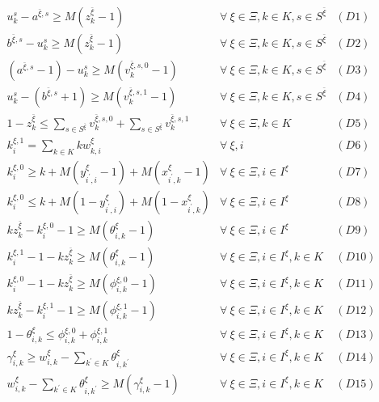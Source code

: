\documentclass[]{interact}
\theoremstyle{plain}%
\theoremstyle{definition}
\theoremstyle{remark}
\begin{document}
\begin{eqnarray}
u^s_k - a^{\bar{\xi},s} \ge M(z^{\bar{\xi}}_{k}-1)&\forall\ \xi\in \Xi,k\in K,s\in S^{\bar{\xi}}&(D1)\nonumber\\
b^{\bar{\xi},s} - u^s_k \ge M(z^{\bar{\xi}}_{k}-1)&\forall\ \xi\in \Xi,k\in K,s\in S^{\bar{\xi}}&(D2)\nonumber\\
( a^{\bar{\xi},s}-1) - u^s_k \ge M(v^{\bar{\xi},s,0}_k-1) & \forall\ \xi\in \Xi,k\in K,s\in S^{\bar{\xi}} &(D3)\nonumber\\
u^s_k -  (b^{\bar{\xi},s}+1) \ge M(v^{\bar{\xi},s,1}_k-1) & \forall\ \xi\in \Xi,k\in K,s\in S^{\bar{\xi}} &(D4)\nonumber\\
1 - z^{\bar{\xi}}_{k} \le \sum_{s\in S^{\bar{\xi}}} v^{\bar{\xi},s,0}_k + \sum_{s\in S^{\bar{\xi}}} v^{\bar{\xi},s,1}_k&\forall\ \xi\in \Xi,k\in K&(D5)\nonumber\\
k^{\xi,1}_i = \sum_{k\in K}kw^{\xi}_{k,i}&\forall\ \xi,i&(D6)\nonumber\\
k^{\xi,0}_i \ge k + M(y^{\xi}_{i^{'},i}-1) + M(x^{\xi}_{i^{'},k}-1) & \forall\ \xi\in \Xi,i\in I^{\xi} & (D7)\nonumber\\
k^{\xi,0}_i \le k + M(1-y^{\xi}_{i^{'},i}) + M(1-x^{\xi}_{i^{'},k}) &  \forall\ \xi\in \Xi,i\in I^{\xi}&(D8)\nonumber\\
kz^{\bar{\xi}}_k -k^{\xi,0}_i - 1 \ge M(\theta^{\xi}_{i,k}-1)& \forall\ \xi\in \Xi,i\in I^{\xi}&(D9)\nonumber\\
k^{\xi,1}_i - 1 - kz^{\bar{\xi}}_k \ge M(\theta^{\xi}_{i,k}-1)& \forall\ \xi\in \Xi,i\in I^{\xi},k\in K&(D10)\nonumber\\
k^{\xi,0}_i-1 - kz^{\bar{\xi}}_k \ge M(\phi^{\xi,0}_{i,k}-1)&\forall\ \xi\in \Xi,i\in I^{\xi},k\in K&(D11)\nonumber\\
kz^{\bar{\xi}}_k - k^{\xi,1}_i - 1\ge M(\phi^{\xi,1}_{i,k}-1)&\forall\ \xi\in \Xi,i\in I^{\xi},k\in K&(D12)\nonumber\\
1-\theta^{\xi}_{i,k} \le \phi^{\xi,0}_{i,k} + \phi^{\xi,1}_{i,k}&\forall\ \xi\in \Xi,i\in I^{\xi},k\in K&(D13)\nonumber\\
\gamma^{\xi}_{i,k} \ge w^{\xi}_{i,k} - \sum_{k^{'}\in K}\theta^{\xi}_{i,k^{'}}&\forall\ \xi\in \Xi,i\in I^{\xi},k\in K&(D14)\nonumber\\
w^{\xi}_{i,k} - \sum_{k^{'}\in K}\theta^{\xi}_{i,k^{'}} \ge M(\gamma^{\xi}_{i,k}-1) &\forall\ \xi\in \Xi,i\in I^{\xi},k\in K&(D15)\nonumber
\end{eqnarray}
\end{document}
